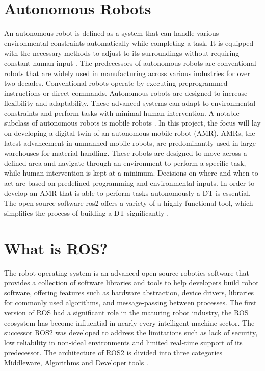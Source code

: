 \section{Autonomous Robots}

An autonomous robot is defined as a system that can handle various environmental constraints automatically while completing a task. It is equipped with the necessary methods to adjust to its surroundings without requiring constant human input \autocite{wahdeINTRODUCTIONAUTONOMOUSROBOTS2016}. 
The predecessors of autonomous robots are conventional robots that are widely used in manufacturing across various industries for over two decades. Conventional robots operate by executing preprogrammed instructions or direct commands.
Autonomous robots are designed to increase flexibility and adaptability. These advanced systems can adapt to environmental constraints and perform tasks with minimal human intervention. 
A notable subclass of autonomous robots is mobile robots \autocite{fahimiAutonomousRobotsModeling2009}. 
In this project, the focus will lay on developing a digital twin of an autonomous mobile robot (AMR). AMRs, the latest advancement in unmanned mobile robots, are predominantly used in large warehouses for material handling. These robots are designed to move across a defined area and navigate through an environment to perform a specific task, while human intervention is kept at a minimum. Decisions on where and when to act are based on predefined programming and environmental inputs. 
In order to develop an AMR that is able to perform tasks autonomously a DT is essential. The open-source software ros2 offers a variety of a highly functional tool, which simplifies the process of building a DT significantly \autocite{staczekDigitalTwinApproach2021}.



\section{What is ROS?}

The robot operating system is an advanced open-source robotics software that provides a collection of software libraries and tools to help developers build robot software, offering features such as hardware abstraction, device drivers, libraries for commonly used algorithms, and message-passing between processes. 
The first version of ROS had a significant role in the maturing robot industry, the ROS ecosystem has become influential in nearly every intelligent machine sector.
The successor ROS2 was developed to address the limitations such as lack of security, low reliability in non-ideal environments and limited real-time support of its predecessor. The architecture of ROS2 is divided into three categories Middleware, Algorithms and Developer tools \autocite{macenskiRobotOperatingSystem2022}.

